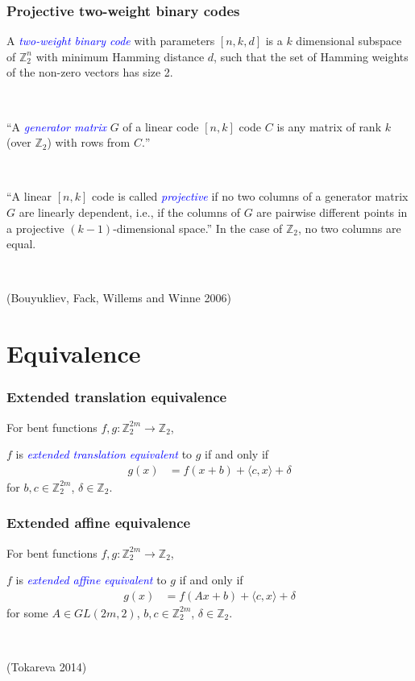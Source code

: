 \documentclass[pdf,sprung,slideColor,nocolorBG]{beamer}
\newcommand{\slidecite}[1]{\tiny{(#1)}\normalsize{}}
\newcommand{\mb}[1]{\mathbb{#1}}
\newcommand{\Emph}[1]{\emph{\textcolor{blue}{#1}}}
\newcommand{\To}{\rightarrow}
\newcommand{\Z}{\mb{Z}}
\begin{document}
\begin{frame}
\frametitle{Projective two-weight binary codes}

\begin{Definition}
A \Emph{two-weight binary code} with parameters $[n,k,d]$ is a $k$ dimensional subspace of $\Z_2^n$ with 
minimum Hamming distance $d$, such that the set of Hamming weights of the non-zero vectors has size 2.

~

``A \Emph{generator matrix} $G$ of a linear code $[n, k]$ code $C$ is any matrix
of rank $k$ (over $\Z_2$) with rows from $C.$''

~

``A linear $[n, k]$ code is called \Emph{projective} if no two columns of a generator matrix
$G$ are linearly dependent, i.e., if the columns of $G$ are pairwise different points in a
projective $(k-1)$-dimensional space.''
In the case of $\Z_2$, no two columns are equal.

~

\slidecite{Bouyukliev, Fack, Willems and Winne 2006}

\end{Definition}

\end{frame}
\section{Equivalence}

\begin{frame}
\frametitle{Extended translation equivalence}

\begin{Definition}
For bent functions $f,g : \Z_2^{2m} \To \Z_2$, 

$f$ is \Emph{extended translation equivalent} to $g$ if and only if
\begin{align*}
g(x) &= f(x + b) + \langle c, x \rangle + \delta 
\end{align*}
for $b, c \in \Z_2^{2m}$, $\delta \in \Z_2$.
\end{Definition}
\end{frame}

\begin{frame}
\frametitle{Extended affine equivalence}

\begin{Definition}
For bent functions $f,g : \Z_2^{2m} \To \Z_2$, 

$f$ is \Emph{extended affine equivalent} to $g$ if and only if
\begin{align*}
g(x) &= f(A x + b) + \langle c, x \rangle + \delta 
\end{align*}
for some $A \in GL(2m,2)$, $b, c \in \Z_2^{2m}$, $\delta \in \Z_2$.
\end{Definition}
~

\slidecite{Tokareva 2014}
\end{frame}
\end{document}
